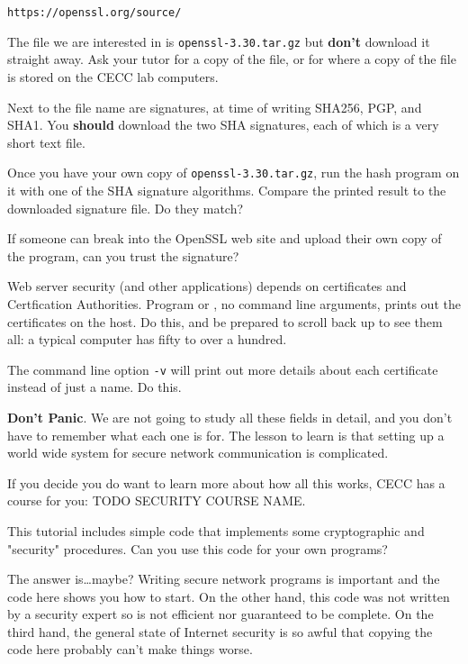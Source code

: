 \texttt{https://openssl.org/source/}

The file we are interested in is \texttt{openssl-3.30.tar.gz} but \textbf{don't}
download it straight away. Ask your tutor for a copy of the file, or for where
a copy of the file is stored on the CECC lab computers.

Next to the file name are signatures, at time of writing SHA256, PGP, and SHA1.
You \textbf{should} download the two SHA signatures, each of which is a very
short text file.

Once you have your own copy of \texttt{openssl-3.30.tar.gz}, run the hash
program on it with one of the SHA signature algorithms. Compare the printed
result to the downloaded signature file. Do they match?

If someone can break into the OpenSSL web site and upload their own copy of
the program, can you trust the signature?



Web server security (and other applications) depends on certificates and
Certfication Authorities. Program  or ,
no command line arguments, prints out the certificates on the host.
Do this, and be prepared to scroll back up to see them all: a typical computer
has fifty to over a hundred.

The command line option \texttt{-v} will print out more details about each
certificate instead of just a name. Do this.

\textbf{Don't Panic}. We are not going to study all these fields in detail,
and you don't have to remember what each one is for. The lesson to learn
is that setting up a world wide system for secure network communication is
complicated.

If you decide you do want to learn more about how all this works, CECC
has a course for you: TODO SECURITY COURSE NAME.



\begin{IMPORTANT}
This tutorial includes simple code that implements some cryptographic and
"security" procedures. Can you use this code for your own programs?

The answer is\ldots maybe? Writing secure network programs is important
and the code here shows you how to start. On the other hand, this code
was not written by a security expert so is not efficient nor guaranteed
to be complete.
On the third hand, the general state of Internet security is so awful
that copying the code here probably can't make things worse.
\end{IMPORTANT}

\COPYRIGHT


